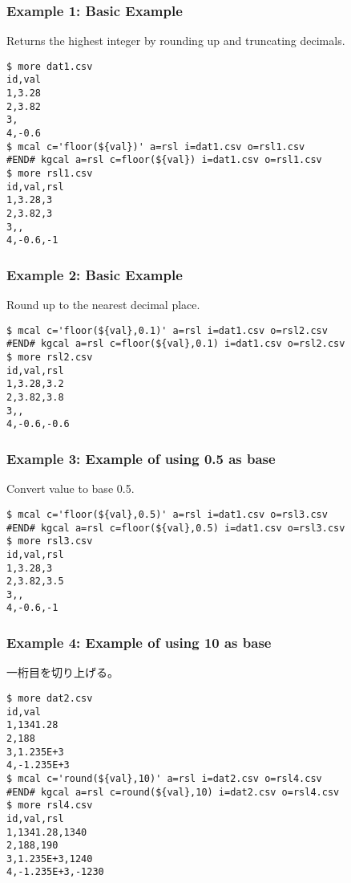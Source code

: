 \subsubsection*{Example 1: Basic Example}

Returns the highest integer by rounding up and truncating decimals.


\begin{Verbatim}[baselinestretch=0.7,frame=single]
$ more dat1.csv
id,val
1,3.28
2,3.82
3,
4,-0.6
$ mcal c='floor(${val})' a=rsl i=dat1.csv o=rsl1.csv
#END# kgcal a=rsl c=floor(${val}) i=dat1.csv o=rsl1.csv
$ more rsl1.csv
id,val,rsl
1,3.28,3
2,3.82,3
3,,
4,-0.6,-1
\end{Verbatim}
\subsubsection*{Example 2: Basic Example}

Round up to the nearest decimal place.


\begin{Verbatim}[baselinestretch=0.7,frame=single]
$ mcal c='floor(${val},0.1)' a=rsl i=dat1.csv o=rsl2.csv
#END# kgcal a=rsl c=floor(${val},0.1) i=dat1.csv o=rsl2.csv
$ more rsl2.csv
id,val,rsl
1,3.28,3.2
2,3.82,3.8
3,,
4,-0.6,-0.6
\end{Verbatim}
\subsubsection*{Example 3: Example of using 0.5 as base}

Convert value to base 0.5.


\begin{Verbatim}[baselinestretch=0.7,frame=single]
$ mcal c='floor(${val},0.5)' a=rsl i=dat1.csv o=rsl3.csv
#END# kgcal a=rsl c=floor(${val},0.5) i=dat1.csv o=rsl3.csv
$ more rsl3.csv
id,val,rsl
1,3.28,3
2,3.82,3.5
3,,
4,-0.6,-1
\end{Verbatim}
\subsubsection*{Example 4: Example of using 10 as base}

一桁目を切り上げる。


\begin{Verbatim}[baselinestretch=0.7,frame=single]
$ more dat2.csv
id,val
1,1341.28
2,188
3,1.235E+3
4,-1.235E+3
$ mcal c='round(${val},10)' a=rsl i=dat2.csv o=rsl4.csv
#END# kgcal a=rsl c=round(${val},10) i=dat2.csv o=rsl4.csv
$ more rsl4.csv
id,val,rsl
1,1341.28,1340
2,188,190
3,1.235E+3,1240
4,-1.235E+3,-1230
\end{Verbatim}
